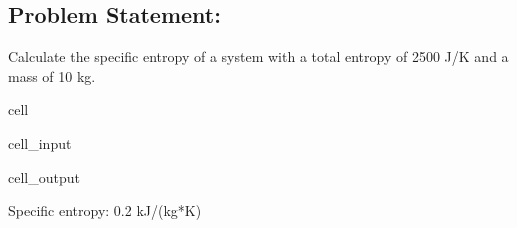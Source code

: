 \documentclass[letterpaper,10pt,english]{jupyterBook}
\begin{document}
\subsection{Problem Statement:}
\label{\detokenize{notebooks/Chapter2/Problem_8_Specific_Entropy_Calculation:problem-statement}}
\sphinxAtStartPar
Calculate the specific entropy of a system with a total entropy of 2500 J/K and a mass of 10 kg.

\begin{sphinxuseclass}{cell}\begin{sphinxVerbatimInput}

\begin{sphinxuseclass}{cell_input}
\begin{sphinxVerbatim}[commandchars=\\\{\}]

    
    

    

\end{sphinxVerbatim}

\end{sphinxuseclass}\end{sphinxVerbatimInput}
\begin{sphinxVerbatimOutput}

\begin{sphinxuseclass}{cell_output}
\begin{sphinxVerbatim}[commandchars=\\\{\}]
Specific entropy: 0.2 kJ/(kg*K)
\end{sphinxVerbatim}

\end{sphinxuseclass}\end{sphinxVerbatimOutput}

\end{sphinxuseclass}
\sphinxstepscope
\end{document}
